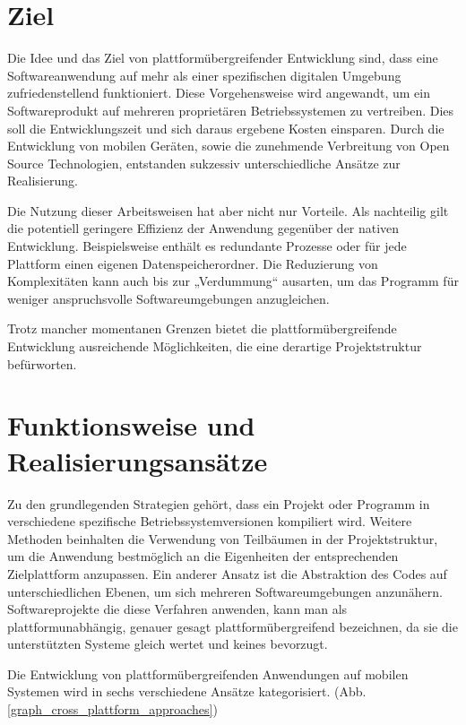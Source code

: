 \section{Ziel}
Die Idee und das Ziel von plattformübergreifender Entwicklung sind, dass eine Softwareanwendung auf mehr als einer spezifischen digitalen Umgebung zufriedenstellend funktioniert. Diese Vorgehensweise wird angewandt, um ein Softwareprodukt auf mehreren proprietären Betriebssystemen zu vertreiben. Dies soll die Entwicklungszeit und sich daraus ergebene Kosten einsparen. Durch die Entwicklung von mobilen Geräten, sowie die zunehmende Verbreitung von Open Source Technologien, entstanden sukzessiv unterschiedliche Ansätze zur Realisierung.

Die Nutzung dieser Arbeitsweisen hat aber nicht nur Vorteile. Als nachteilig gilt die potentiell geringere Effizienz der Anwendung gegenüber der nativen Entwicklung. Beispielsweise enthält es redundante Prozesse oder für jede Plattform einen eigenen Datenspeicherordner. Die Reduzierung von Komplexitäten kann auch bis zur „Verdummung“ ausarten, um das Programm für weniger anspruchsvolle Softwareumgebungen anzugleichen. 

Trotz mancher momentanen Grenzen bietet die plattformübergreifende Entwicklung ausreichende Möglichkeiten, die eine derartige Projektstruktur befürworten.\citep{cross_plattform_explanation}

\section{Funktionsweise und Realisierungsansätze}
Zu den grundlegenden Strategien gehört, dass ein Projekt oder Programm in verschiedene spezifische Betriebssystemversionen kompiliert wird. Weitere Methoden beinhalten die Verwendung von Teilbäumen in der Projektstruktur, um die Anwendung bestmöglich an die Eigenheiten der entsprechenden Zielplattform anzupassen. Ein anderer Ansatz ist die Abstraktion des Codes auf unterschiedlichen Ebenen, um sich mehreren Softwareumgebungen anzunähern. Softwareprojekte die diese Verfahren anwenden, kann man als plattformunabhängig, genauer gesagt plattformübergreifend bezeichnen, da sie die unterstützten Systeme gleich wertet und keines bevorzugt.\citep{cross_plattform_explanation}

\medskip
Die Entwicklung von plattformübergreifenden Anwendungen auf mobilen Systemen wird in sechs verschiedene Ansätze kategorisiert. (Abb.\ref{graph_cross_plattform_approaches})

